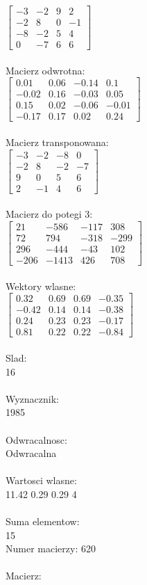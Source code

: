 \documentclass[a4paper,12pt]{article}
\begin{document}
$\begin{bmatrix} -3&-2&9&2\\-2&8&0&-1\\-8&-2&5&4\\0&-7&6&6 \end{bmatrix}$
\\
\\
Macierz odwrotna:\\

$\begin{bmatrix} 0.01&0.06&-0.14&0.1\\-0.02&0.16&-0.03&0.05\\0.15&0.02&-0.06&-0.01\\-0.17&0.17&0.02&0.24 \end{bmatrix}$
\\
\\
Macierz transponowana:\\

$\begin{bmatrix} -3&-2&-8&0\\-2&8&-2&-7\\9&0&5&6\\2&-1&4&6 \end{bmatrix}$
\\
\\
Macierz do potegi 3:\\

$\begin{bmatrix} 21&-586&-117&308\\72&794&-318&-299\\296&-444&-43&102\\-206&-1413&426&708 \end{bmatrix}$
\\
\\
Wektory wlasne:\\

$\begin{bmatrix} 0.32&0.69&0.69&-0.35\\-0.42&0.14&0.14&-0.38\\0.24&0.23&0.23&-0.17\\0.81&0.22&0.22&-0.84 \end{bmatrix}$
\\
\\
Slad:\\
16
\\
\\
Wyznacznik:\\
1985
\\
\\
Odwracalnosc:\\
Odwracalna
\\
\\
Wartosci wlasne:\\
11.42 0.29 0.29 4
\\
\\
Suma elementow:\\
15
\\
\newpage
Numer macierzy:
620
\\
\\
Macierz:\\
\end{document}
